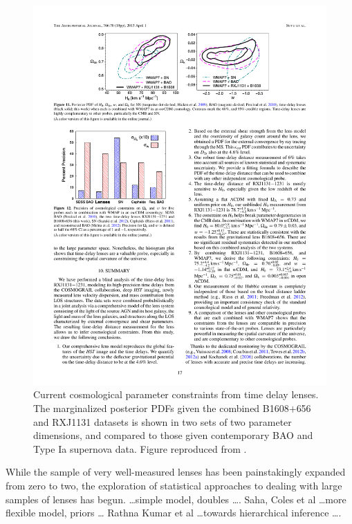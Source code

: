 \begin{figure}[!ht]
\centering\includegraphics[width=0.9\linewidth]{figures/Suyu13_fig11.pdf}
\caption{Current cosmological parameter constraints from time delay
lenses. The marginalized posterior PDFs given the combined B1608$+$656
and RXJ1131 datasets is shown in two sets of two parameter dimensions,
and compared to those given contemporary BAO and Type Ia supernova data.
Figure reproduced from \citet{Suy++14}.}
\label{fig:current-constraints}
\end{figure}

While the sample of very well-measured lenses has been painstakingly
expanded from zero to two,  the exploration of statistical approaches to
dealing with large samples of lenses has begun. \citet{Oguri2007} \ldots simple model, doubles \ldots.
Saha, Coles et al \ldots more flexible model, priors \ldots
Rathna Kumar et al \ldots towards hierarchical inference \ldots.
